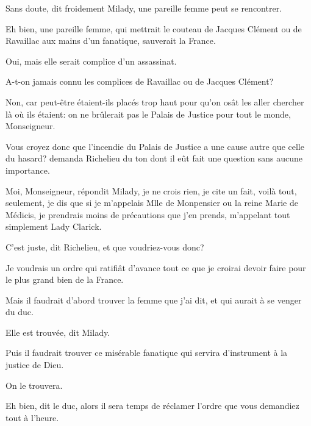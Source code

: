\speak  Sans doute, dit froidement Milady, une pareille femme peut se rencontrer. 

\speak  Eh bien, une pareille femme, qui mettrait le couteau de Jacques Clément ou de Ravaillac aux mains d'un fanatique, sauverait la France. 

\speak  Oui, mais elle serait complice d'un assassinat. 

\speak  A-t-on jamais connu les complices de Ravaillac ou de Jacques Clément? 

\speak  Non, car peut-être étaient-ils placés trop haut pour qu'on osât les aller chercher là où ils étaient: on ne brûlerait pas le Palais de Justice pour tout le monde, Monseigneur. 

\speak  Vous croyez donc que l'incendie du Palais de Justice a une cause autre que celle du hasard? demanda Richelieu du ton dont il eût fait une question sans aucune importance. 

\speak  Moi, Monseigneur, répondit Milady, je ne crois rien, je cite un fait, voilà tout, seulement, je dis que si je m'appelais Mlle de Monpensier ou la reine Marie de Médicis, je prendrais moins de précautions que j'en prends, m'appelant tout simplement Lady Clarick. 

\speak  C'est juste, dit Richelieu, et que voudriez-vous donc? 

\speak  Je voudrais un ordre qui ratifiât d'avance tout ce que je croirai devoir faire pour le plus grand bien de la France. 

\speak  Mais il faudrait d'abord trouver la femme que j'ai dit, et qui aurait à se venger du duc. 

\speak  Elle est trouvée, dit Milady. 

\speak  Puis il faudrait trouver ce misérable fanatique qui servira d'instrument à la justice de Dieu. 

\speak  On le trouvera. 

\speak  Eh bien, dit le duc, alors il sera temps de réclamer l'ordre que vous demandiez tout à l'heure. 

